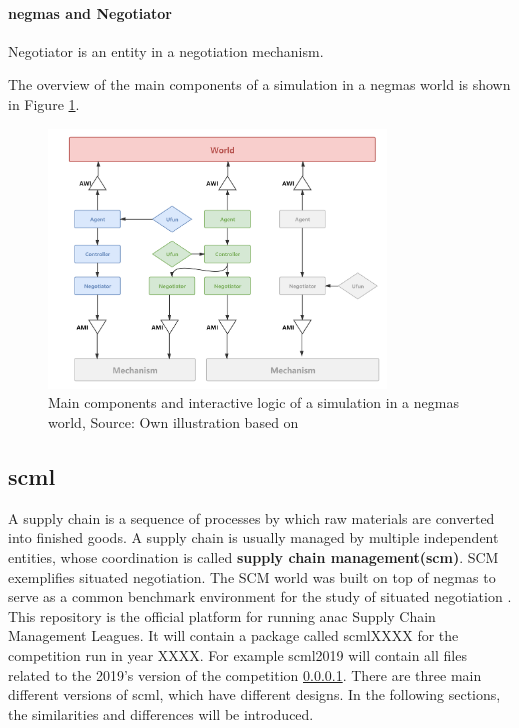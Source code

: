 \paragraph{\gls{negmas} and Negotiator} Negotiator is an entity in a negotiation mechanism.

The overview of the main components of a simulation in a \gls{negmas} world is shown in Figure \ref{fig:overview-negmas}.

\begin{figure}[htbp]
\centering
\includegraphics[width=0.8\textwidth]{./images/overview-negmas.png}
\caption{Main components and interactive logic of a simulation in a \gls{negmas} world, Source: Own illustration based on\parencite{Mohammad2019}}
\label{fig:overview-negmas}
\end{figure}

\subsection{\gls{scml}} \label{background-scml}
A supply chain is a sequence of processes by which raw materials are converted into finished goods. A supply chain is usually managed by multiple independent entities, whose coordination is called \textbf{supply chain management(\gls{scm})}. SCM exemplifies situated negotiation. The SCM world was built on top of  \gls{negmas} to serve as a common benchmark environment for the study of situated negotiation \parencite{Mohammad2019}. This repository is the official platform for running \gls{anac} Supply Chain Management Leagues. It will contain a package called scmlXXXX for the competition run in year XXXX. For example scml2019 will contain all files related to the 2019’s version of the competition \ref{}.
There are three main different versions of \gls{scml}, which have different designs. In the following sections, the similarities and differences will be introduced. 

